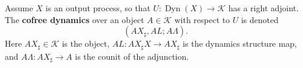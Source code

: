 Assume $X$ is an output process, so that $U: \operatorname{Dyn}(X) \to \mathcal{K}$ has a right adjoint. The \textbf{cofree dynamics} over an object $A \in \mathcal{K}$ with respect to $U$ is denoted
$$(AX_{\sharp}, AL; A\Lambda).$$
Here $AX_{\sharp} \in \mathcal{K}$ is the object, $AL: AX_{\sharp} X \to AX_{\sharp}$ is the dynamics structure map, and $A\Lambda: AX_{\sharp} \to A$ is the counit of the adjunction.

